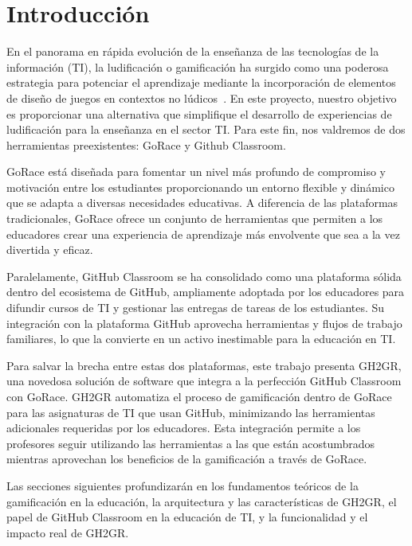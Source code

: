 \setlength{\parskip}{1em}

\section{Introducción}
En el panorama en rápida evolución de la enseñanza de las tecnologías de la información (\acrshort{TI}), la ludificación o gamificación ha surgido como una poderosa estrategia para potenciar el aprendizaje mediante la incorporación de elementos de diseño de juegos en contextos no lúdicos~\cite{10.1145/3231709}. En este proyecto, nuestro objetivo es proporcionar una alternativa que simplifique el desarrollo de experiencias de ludificación para la enseñanza en el sector \acrshort{TI}. Para este fin, nos valdremos de dos herramientas preexistentes: GoRace y Github Classroom.

GoRace está diseñada para fomentar un nivel más profundo de compromiso y motivación entre los estudiantes proporcionando un entorno flexible y dinámico que se adapta a diversas necesidades educativas. A diferencia de las plataformas tradicionales, GoRace ofrece un conjunto de herramientas que permiten a los educadores crear una experiencia de aprendizaje más envolvente que sea a la vez divertida y eficaz.

Paralelamente, GitHub Classroom se ha consolidado como una plataforma sólida dentro del ecosistema de GitHub, ampliamente adoptada por los educadores para difundir cursos de \acrshort{TI} y gestionar las entregas de tareas de los estudiantes. Su integración con la plataforma GitHub aprovecha herramientas y flujos de trabajo familiares, lo que la convierte en un activo inestimable para la educación en \acrshort{TI}.

Para salvar la brecha entre estas dos plataformas, este trabajo presenta GH2GR, una novedosa solución de software que integra a la perfección GitHub Classroom con GoRace. GH2GR automatiza el proceso de gamificación dentro de GoRace para las asignaturas de \acrshort{TI} que usan GitHub, minimizando las herramientas adicionales requeridas por los educadores. Esta integración permite a los profesores seguir utilizando las herramientas a las que están acostumbrados mientras aprovechan los beneficios de la gamificación a través de GoRace.

Las secciones siguientes profundizarán en los fundamentos teóricos de la gamificación en la educación, la arquitectura y las características de GH2GR, el papel de GitHub Classroom en la educación de \acrshort{TI}, y la funcionalidad y el impacto real de GH2GR.

